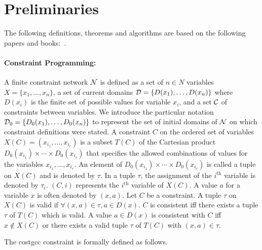 \section{Preliminaries}
\label{sec:Preliminaries}
The following definitions, theorems and algorithms are based on the following papers and books:~\cite{Regin:CostbasedArcConsistencyforGlobalCardinalityConstraints,Berge:GrapheetHypergraphes,Lawler:CombinatorialOptimization,Tarjan:DataStructuresandNetworkAlgorithms,Ahuja:NetworkFlows}.


\paragraph*{Constraint Programming:}
A finite constraint network ${\cal N}$ is defined as a set of $n \in N$ variables $X=\{x_1, \ldots, x_n\}$, a set of current domains ${\cal D} = \{D(x_1),\ldots, D(x_n)\}$ where $D(x_i)$ is the finite set of possible values for variable $x_i$, and a set ${\cal C}$ of constraints between variables. 
We introduce the particular notation ${\cal D}_0 = \{D_0(x_1),\ldots, 
D_0(x_n)\}$ to represent the set of initial domains of ${\cal N}$ 
on which constraint definitions were stated. 
A constraint $C$ on the ordered set of variables 
$X(C)=(x_{i_1},\ldots,x_{i_r})$ is a subset $T(C)$ of the Cartesian 
product $D_0(x_{i_1}) \times \cdots \times D_0(x_{i_r})$ 
that specifies the allowed combinations of values for 
the variables $x_{i_1}, \ldots, x_{i_r}$. 
An element of $D_0(x_{i_1}) \times \cdots \times D_0(x_{i_r})$ 
is called a tuple on $X(C)$ and is denoted by $\tau$. In a tuple $\tau$, the assignment of the $i^{\text{th}}$ variable is denoted by $\tau_i$. \var$(C,i)$ represents the $i^{\text{th}}$ 
variable of $X(C)$.
A value $a$ for a variable $x$ is often denoted by $(x,a)$. 
Let $C$ be a constraint. A tuple $\tau$ on $X(C)$ is valid if $\forall (x, a) \in \tau, a \in D(x)$. $C$ is consistent iff there exists a tuple $\tau$ of $T(C)$ which is valid. A value $a \in D(x)$ is consistent with $C$ iff $x \not \in X(C)$ or there exists a valid tuple $\tau$ of $T(C)$ with $(x,a) \in \tau$. 

The costgcc constraint is formally defined as follows.


